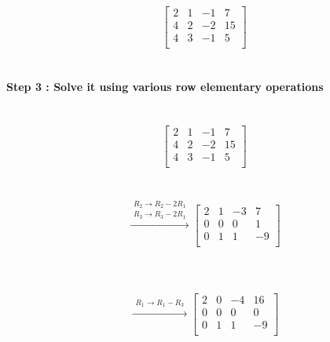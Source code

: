\documentclass[15pt]{article}
\begin{document}
\[
 \left[\begin{array}{rrr|r}
2 &  1 & -1 &  7\\
4 &  2 & -2 & 15\\
4 &  3 & -1 &  5\\
   \end{array} \right]
\]\\
\\
\textbf{Step 3 : Solve it using various row elementary operations }\\
\\
\\
\[
\left[\begin{array}{rrr|r}
 2 &  1 & -1 &  7\\
4 &  2 & -2 & 15\\
4 &  3 & -1 &  5\\
  \end{array}\right]
  \]
  \\
  \\
  \[
  \xrightarrow{\substack{R_2 \rightarrow R_2 - 2R_1 \\ R_3 \rightarrow R_3 - 2R_1}}
  \left[\begin{array}{rrr|r}
 2 &  1 & -3 & 7 \\
 0 &  0 &  0 & 1 \\
 0 &  1 &  1 & -9 \\ 
  
  \end{array}\right]
  \]
  \\
  \\
  \
  \[
 \xrightarrow{\substack{R_1 \rightarrow R_1 - R_3}}
\left[\begin{array}{rrr|r}
  2 & 0 & -4 & 16 \\
  0 & 0 &  0 & 0 \\
  0 & 1 &  1 & -9 \\
  \end{array}\right]
  \]\\
\end{document}
